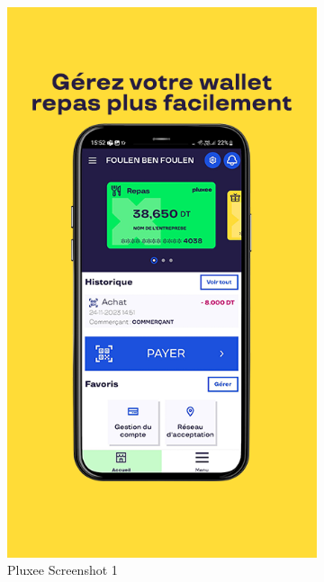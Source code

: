 \begin{figure}[!htb]
    \centering
    \begin{subfigure}[b]{0.32\textwidth}
        \centering
        \includegraphics[width=\textwidth]{images/pluxee_screenshot_1.png}
        \caption{Pluxee Screenshot 1}
        \label{fig:pluxee_1}
    \end{subfigure}
    \hfill
    \begin{subfigure}[b]{0.32\textwidth}
        \centering

\end{subfigure}
\end{figure}
